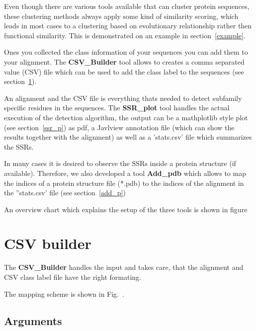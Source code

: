 \documentclass[a4paper,10pt]{article}
\begin{document}
Even though there are various tools available that can cluster protein sequences, 
these clustering methods always apply some kind of similarity scoring,
which leads in most cases to a clustering based on evolutionary relationship 
rather then functional similarity. 
This is demonstrated on an example in section~\ref{example}.

Ones you collected the class information of your sequences you can add
them to your alignment. The \textbf{CSV\_Builder} tool allows to creates 
a comma separated value (CSV) file which can be used to add the class label to the sequences
(see section~\ref{csv_b}).

An alignment and the CSV file is everything thats needed to 
detect subfamily specific residues in the sequences. 
The \textbf{SSR\_plot} tool handles the actual execution of the detection
algorithm, the output can be a mathplotlib  style plot (see section~\ref{ssr_p})
as pdf, a Javlview annotation file (which can show the results together with the 
alignment) as well as a 'stats.csv' file which summarizes the SSRs.

In many cases it is desired to observe the SSRs inside a protein 
structure (if available). Therefore, we also developed a tool \textbf{Add\_pdb} which allows
to map the indices of a protein structure file (*.pdb) to the indices of the 
alignment in the ''stats.csv' file (see section~\ref{add_p})

An overview chart which explains the setup of the three tools is shown in
figure~

\section{CSV builder} \label{csv_b}

The \textbf{CSV\_Builder} handles the input and takes care, 
that the alignment and CSV class label file have the right formating.

The mapping scheme is shown in Fig.~.

\subsection{Arguments}
\end{document}
